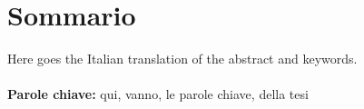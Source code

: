 \chapter*{Sommario}
Here goes the Italian translation of the abstract and keywords.
\\
\\
\textbf{Parole chiave:} qui, vanno, le parole chiave, della tesi %